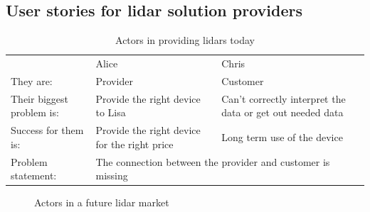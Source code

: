 \subsection*{User stories for lidar solution providers} 

\begin{table}[!h]
    \centering
    \caption{Actors in providing lidars today}
    \begin{tabular}{@{}|p{}|p{}|p{}|p{}|@{}}
    \rowcolor{Task32Blue2} & Alice & & Chris \\
    They are: &
        Provider &
        &
        Customer \\
    Their biggest problem is: &
        Provide the right device to Lisa & 
        &
        Can't correctly interpret the data or get out needed data \\
    Success for them is: &
        Provide the right device for the right price &
        &
    Long term use of the device \\
    Problem statement: &
        \multicolumn{3}{|p{0.765\textwidth+4\tabcolsep+2\arrayrulewidth}|}{The connection between the provider and customer is missing}
\end{tabular}
\label{tab:04_lidarSolutionsProvider_now}
\end{table}

\begin{figure}[!h]
    \centering
    \caption{Actors in a future lidar market}
    \label{fig:04_lidarSolutionsProvider_future}
\end{figure}


